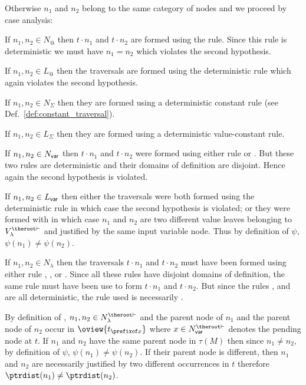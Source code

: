 Otherwise $n_1$ and $n_2$ belong to the same category of nodes and we proceed by case analysis:
\begin{compactitem}
\item If $n_1, n_2 \in N_@$ then $t
\cdot n_1$ and $t \cdot n_2$ are formed using the 
rule. Since this rule is deterministic we must have $n_1=n_2$ which
violates the second hypothesis.

\item If $n_1, n_2 \in L_@$ then the traversals are formed using the deterministic rule
 which again violates the
second hypothesis.

\item If $n_1, n_2 \in N_\Sigma$ then they are formed using a deterministic constant rule (see Def.\ \ref{def:constant_traversal}).

\item If $n_1, n_2 \in L_\Sigma$  then they are formed using a deterministic value-constant rule.

\item If $n_1,n_2\in N_{\sf var}$ then
     $t \cdot n_1$ and $t \cdot n_2$ were formed using either rule  or .
     But these two rules are deterministic and their domains of definition are disjoint. Hence again the second
     hypothesis is violated.

\item If  $n_1, n_2 \in L_{\sf var}$ then either the traversals were both formed using the deterministic rule
 in which case the
second hypothesis is violated; or they were formed with
 in which case $n_1$ and $n_2$ are two
different value leaves belonging to $V^{\theroot\vdash}_\lambda$ and
justified by the same input variable node. Thus by definition of
$\psi$, $\psi(n_1)\neq\psi(n_2)$.

\item If  $n_1,n_2\in N_\lambda$ then the traversals $t \cdot n_1$
    and $t \cdot n_2$ must have been formed using either rule
    , ,  or . Since all these rules have
    disjoint domains of definition, the same rule must have been use to
    form $t \cdot n_1$ and $t \cdot n_2$.
    But since the rules ,  and  are all deterministic,
    the rule used is necessarily .

    By definition of , $n_1,n_2\in N_\lambda^{\theroot\vdash}$ and the parent node of $n_1$ and the parent node of $n_2$  occur in  $\oview{t_{\prefixof x}}$ where $x \in N^{\theroot\vdash}_{\sf var}$
    denotes the pending node at $t$. If $n_1$ and $n_2$ have the same
    parent node in $\tau(M)$ then since $n_1\neq n_2$, by definition of
    $\psi$, $\psi(n_1)\neq \psi(n_2)$. If their parent node is
    different, then $n_1$ and $n_2$ are necessarily justified by two different
    occurrences in $t$ therefore $\ptrdist(n_1) \neq \ptrdist(n_2)$.


\end{compactitem}
